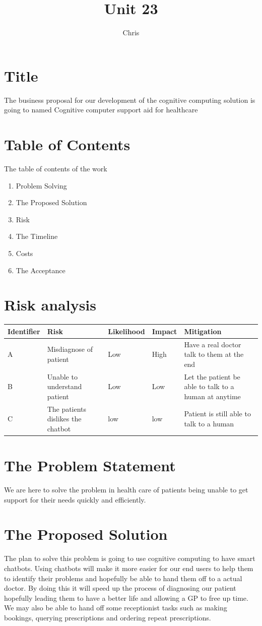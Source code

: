 \documentclass{article}
\title{Unit 23}
\author{Chris}
\date{}
\begin{document}
\section{Title}
The business proposal for our development of the cognitive computing solution is going to named 
Cognitive computer support aid for healthcare

\section{Table of Contents}
The table of contents of the work
\begin{enumerate}
	\item Problem Solving
	\item The Proposed Solution
	\item Risk
	\item The Timeline
	\item Costs
	\item The Acceptance
\end{enumerate}

\section{Risk analysis}
\begin{center}
	\begin{tabular}{||p{5em}|p{5cm}|p{2cm}|p{2cm}|p{4cm}||}
	\hline
		Identifier & Risk & Likelihood & Impact & Mitigation \\
	\hline
	\hline
		A & Misdiagnose of patient & Low & High & Have a real doctor talk to them at the end \\
	\hline 
		B & Unable to understand patient & Low & Low & Let the patient be able to talk to a human at anytime \\
	\hline
		C & The patients dislikes the chatbot & low & low & Patient is still able to talk to a human \\
	\hline 
\end{tabular}
\end{center}

\section{The Problem Statement}
We are here to solve the problem in health care of patients being unable to get support for their needs quickly and efficiently.

\section{The Proposed Solution}
The plan to solve this problem is going to use cognitive computing to have smart chatbots. Using chatbots will make it more easier for our end users to help them to identify their problems and hopefully be able to hand them off to a actual doctor. By doing this it will speed up the process of diagnosing our patient hopefully leading them to have a better life and allowing a GP to free up time. We may also be able to hand off some receptionist tasks such as making bookings, querying prescriptions and ordering repeat prescriptions.
\end{document}
